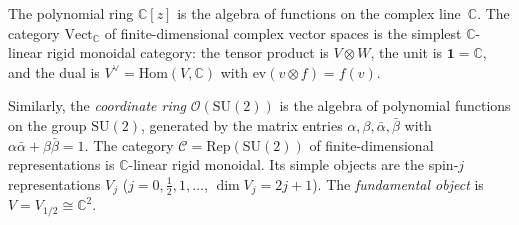 \begin{example}
\label{ex:rigid-monoidal-vect}
The polynomial ring $\mathbb{C}[z]$ is the algebra of functions on the
complex line~$\mathbb{C}$.  The category
$\mathrm{Vect}_{\mathbb{C}}$ of finite-dimensional complex vector spaces
is the simplest $\mathbb{C}$-linear rigid monoidal category: the tensor
product is $V \otimes W$, the unit is $\mathbf{1} = \mathbb{C}$, and the
dual is $V^{\vee} = \mathrm{Hom}(V, \mathbb{C})$ with
$\mathrm{ev}(v \otimes f) = f(v)$.

Similarly, the \emph{coordinate ring} $\mathcal{O}(\mathrm{SU}(2))$ is
the algebra of polynomial functions on the group $\mathrm{SU}(2)$,
generated by the matrix entries $\alpha, \beta, \bar\alpha, \bar\beta$
with $\alpha\bar\alpha + \beta\bar\beta = 1$.  The category
$\mathcal{C} = \mathrm{Rep}(\mathrm{SU}(2))$ of finite-dimensional
representations is $\mathbb{C}$-linear rigid monoidal.  Its simple
objects are the spin-$j$ representations $V_j$
($j = 0, \tfrac12, 1, \ldots$, $\dim V_j = 2j+1$).  The
\emph{fundamental object} is $V = V_{1/2} \cong \mathbb{C}^2$.
\end{example}


